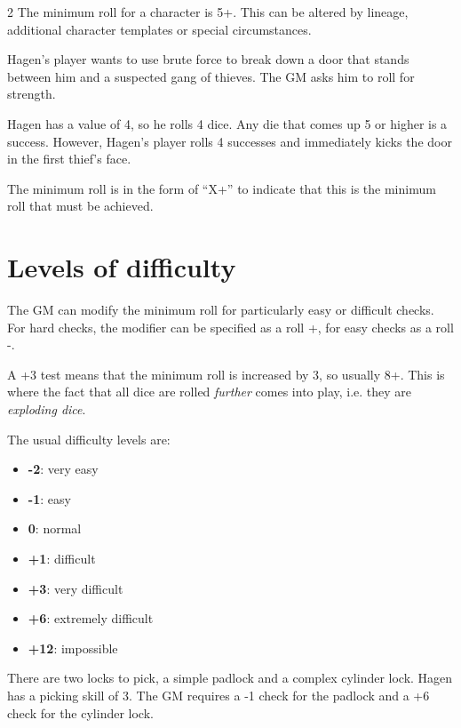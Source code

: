 \begin{multicols}{2}
The minimum roll for a character is 5+. This can be altered by lineage, additional character templates or special circumstances.

\begin{pexample}[Example]
Hagen's player wants to use brute force to break down a door that stands between him and a suspected gang of thieves. The GM asks him to roll for strength.

Hagen has a value of 4, so he rolls 4 dice. Any die that comes up 5 or higher is a success. However, Hagen's player rolls 4 successes and immediately kicks the door in the first thief's face.
\end{pexample}

The minimum roll is in the form of ``X+'' to indicate that this is the minimum roll that must be achieved.

\section{Levels of difficulty}

The GM can modify the minimum roll for particularly easy or difficult checks. For hard checks, the modifier can be specified as a roll +, for easy checks as a roll -.

A +3 test means that the minimum roll is increased by 3, so usually 8+. This is where the fact that all dice are rolled \textit{further} comes into play, i.e. they are \textit{exploding dice}.

The usual difficulty levels are:

\begin{itemize}
    \item \textbf{-2}: very easy
    \item \textbf{-1}: easy
    \item \textbf{0}: normal
    \item \textbf{+1}: difficult
    \item \textbf{+3}: very difficult
    \item \textbf{+6}: extremely difficult
    \item \textbf{+12}: impossible
\end{itemize}

\begin{pexample}[Example]
There are two locks to pick, a simple padlock and a complex cylinder lock. Hagen has a picking skill of 3. The GM requires a -1 check for the padlock and a +6 check for the cylinder lock.


\end{pexample}
\end{multicols}
